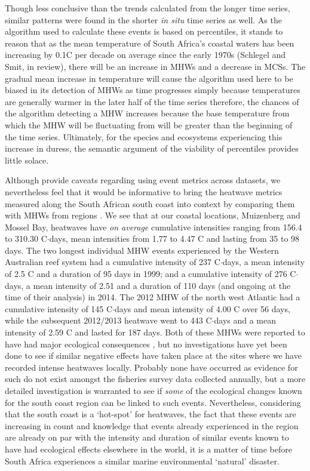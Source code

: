 \documentclass[a4paper,10pt,review]{elsarticle}
\begin{document}
Though less conclusive than the trends calculated from the longer time series, similar patterns were found in the shorter \emph{in situ} time series as well. As the algorithm used to calculate these events is based on percentiles, it stands to reason that as the mean temperature of South Africa's coastal waters has been increasing by 0.1\degree C per decade on average since the early 1970s (Schlegel and Smit, in review), there will be an increase in MHWs and a decrease in MCSs. The gradual mean increase in temperature will cause the algorithm used here to be biased in its detection of MHWs as time progresses simply because temperatures are generally warmer in the later half of the time series therefore, the chances of the algorithm detecting a MHW increases because the base temperature from which the MHW will be fluctuating from will be greater than the beginning of the time series. Ultimately, for the species and ecosystems experiencing this increase in duress, the semantic argument of the viability of percentiles provides little solace.

Although \citet{Hobday2016} provide caveats regarding using event metrics across datasets, we nevertheless feel that it would be informative to bring the heatwave metrics measured along the South African south coast into context by comparing them with MHWs from regions \citep[see][]{Hobday2016}. We see that at our coastal locations, Muizenberg and Mossel Bay, heatwaves have \emph{on average} cumulative intensities ranging from 156.4 to 310.30 \degree C$\cdot$days, mean intensities from 1.77 to 4.47 \degree C and lasting from 35 to 98 days. The two longest individual MHW events experienced by the Western Australian reef system \citep{Feng2013} had a cumulative intensity of 237 \degree C$\cdot$days, a mean intensity of 2.5 \degree C and a duration of 95 days in 1999; and a cumulative intensity of 276 \degree C$\cdot$days, a mean intensity of 2.51 and a duration of 110 days (and ongoing at the time of their analysis) in 2014. The 2012 MHW of the north west Atlantic \citep{Mills2012, Chen2014} had a cumulative intensity of 145 \degree C$\cdot$days and mean intensity of 4.00 \degree C over 56 days, while the subsequent 2012/2013 heatwave went to 443 \degree C$\cdot$days and a mean intensity of 2.59 \degree C and lasted for 187 days. Both of these MHWs were reported to have had major ecological consequences \citep{Feng2013, Mills2012, Chen2014}, but no investigations have yet been done to see if similar negative effects have taken place at the sites where we have recorded intense heatwaves locally. Probably none have occurred as evidence for such do not exist amongst the fisheries survey data collected annually, but a more detailed investigation is warranted to see if \emph{some} of the ecological changes known for the south coast region \citep{Bolton2012} can be linked to such events. Nevertheless, considering that the south coast is a `hot-spot' for heatwaves, the fact that these events are increasing in count and knowledge that events already experienced in the region are already on par with the intensity and duration of similar events known to have had ecological effects elsewhere in the world, it is a matter of time before South Africa experiences a similar marine environmental `natural' disaster.
\end{document}
